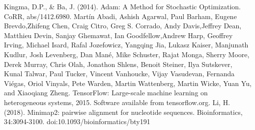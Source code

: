 \documentclass[a4paper,11pt,twoside]{report}
\theoremstyle{definition}
\begin{document}
\begin{thebibliography}{20}
Kingma, D.P., \& Ba, J. (2014). Adam: A Method for Stochastic Optimization. CoRR, abs/1412.6980.
Martín Abadi, Ashish Agarwal, Paul Barham, Eugene Brevdo,Zhifeng Chen, Craig Citro, Greg S. Corrado, Andy Davis,Jeffrey Dean, Matthieu Devin, Sanjay Ghemawat, Ian Goodfellow,Andrew Harp, Geoffrey Irving, Michael Isard, Rafal Jozefowicz, Yangqing Jia, Lukasz Kaiser, Manjunath Kudlur, Josh Levenberg, Dan Mané, Mike Schuster, Rajat Monga, Sherry Moore, Derek Murray, Chris Olah, Jonathon Shlens, Benoit Steiner, Ilya Sutskever, Kunal Talwar, Paul Tucker, Vincent Vanhoucke, Vijay Vasudevan, Fernanda Viégas, Oriol Vinyals, Pete Warden, Martin Wattenberg, Martin Wicke, Yuan Yu, and Xiaoqiang Zheng. TensorFlow: Large-scale machine learning on heterogeneous systems, 2015. Software available from tensorflow.org.
 Li, H. (2018). Minimap2: pairwise alignment for nucleotide sequences. Bioinformatics, 34:3094-3100. doi:10.1093/bioinformatics/bty191
\end{thebibliography}

\thispagestyle{empty}




\listoffigures
\thispagestyle{empty}


\renewcommand{\listtablename}{Spis tabel}
\listoftables
\thispagestyle{empty}



\thispagestyle{empty}
\end{document}
